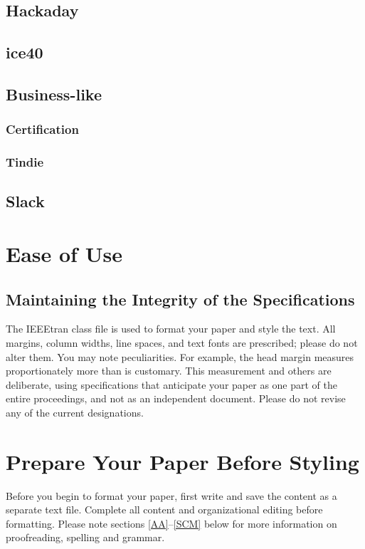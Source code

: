 \documentclass[conference]{IEEEtran}
\begin{document}
\subsection{Hackaday}


\subsection{ice40}

\subsection{Business-like}

\subsubsection{Certification}

\subsubsection{Tindie}


\subsection{Slack}


\section{Ease of Use}

\subsection{Maintaining the Integrity of the Specifications}

The IEEEtran class file is used to format your paper and style the text. All margins, 
column widths, line spaces, and text fonts are prescribed; please do not 
alter them. You may note peculiarities. For example, the head margin
measures proportionately more than is customary. This measurement 
and others are deliberate, using specifications that anticipate your paper 
as one part of the entire proceedings, and not as an independent document. 
Please do not revise any of the current designations.

\section{Prepare Your Paper Before Styling}
Before you begin to format your paper, first write and save the content as a 
separate text file. Complete all content and organizational editing before 
formatting. Please note sections \ref{AA}--\ref{SCM} below for more information on 
proofreading, spelling and grammar.
\end{document}
